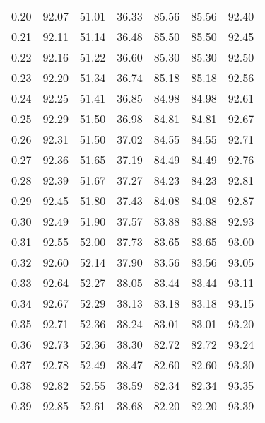 \begin{tabular}{|c|c|c|c|c|c|c|}
      0.20 &     92.07 &     51.01 &      36.33 &   85.56 &      85.56 &         92.40 \\
      0.21 &     92.11 &     51.14 &      36.48 &   85.50 &      85.50 &         92.45 \\
      0.22 &     92.16 &     51.22 &      36.60 &   85.30 &      85.30 &         92.50 \\
      0.23 &     92.20 &     51.34 &      36.74 &   85.18 &      85.18 &         92.56 \\
      0.24 &     92.25 &     51.41 &      36.85 &   84.98 &      84.98 &         92.61 \\
      0.25 &     92.29 &     51.50 &      36.98 &   84.81 &      84.81 &         92.67 \\
      0.26 &     92.31 &     51.50 &      37.02 &   84.55 &      84.55 &         92.71 \\
      0.27 &     92.36 &     51.65 &      37.19 &   84.49 &      84.49 &         92.76 \\
      0.28 &     92.39 &     51.67 &      37.27 &   84.23 &      84.23 &         92.81 \\
      0.29 &     92.45 &     51.80 &      37.43 &   84.08 &      84.08 &         92.87 \\
      0.30 &     92.49 &     51.90 &      37.57 &   83.88 &      83.88 &         92.93 \\
      0.31 &     92.55 &     52.00 &      37.73 &   83.65 &      83.65 &         93.00 \\
      0.32 &     92.60 &     52.14 &      37.90 &   83.56 &      83.56 &         93.05 \\
      0.33 &     92.64 &     52.27 &      38.05 &   83.44 &      83.44 &         93.11 \\
      0.34 &     92.67 &     52.29 &      38.13 &   83.18 &      83.18 &         93.15 \\
      0.35 &     92.71 &     52.36 &      38.24 &   83.01 &      83.01 &         93.20 \\
      0.36 &     92.73 &     52.36 &      38.30 &   82.72 &      82.72 &         93.24 \\
      0.37 &     92.78 &     52.49 &      38.47 &   82.60 &      82.60 &         93.30 \\
      0.38 &     92.82 &     52.55 &      38.59 &   82.34 &      82.34 &         93.35 \\
      0.39 &     92.85 &     52.61 &      38.68 &   82.20 &      82.20 &         93.39 \\

\end{tabular}

